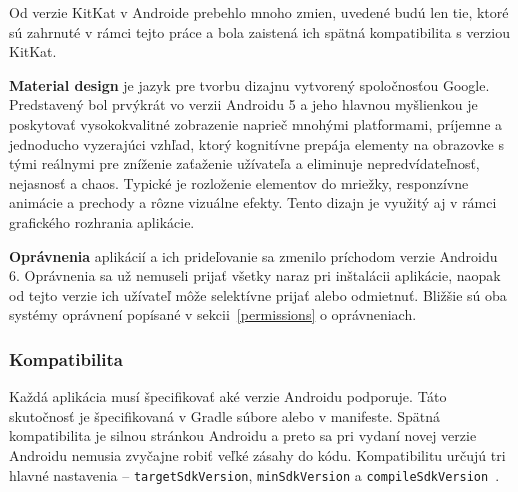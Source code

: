 
Od verzie KitKat v Androide prebehlo mnoho zmien, uvedené budú len tie, ktoré sú zahrnuté v rámci tejto práce a bola zaistená ich spätná kompatibilita s verziou KitKat. 

\textbf{Material design} je jazyk pre tvorbu dizajnu vytvorený spoločnosťou Google. Predstavený bol prvýkrát vo verzii Androidu 5 a jeho hlavnou myšlienkou je poskytovať vysokokvalitné zobrazenie naprieč mnohými platformami, príjemne a jednoducho vyzerajúci vzhľad, ktorý kognitívne prepája elementy na obrazovke s tými reálnymi pre zníženie zaťaženie užívateľa a eliminuje nepredvídateľnosť, nejasnosť a chaos. Typické je rozloženie elementov do mriežky, responzívne animácie a prechody a rôzne vizuálne efekty. Tento dizajn je využitý aj v rámci grafického rozhrania aplikácie.

\textbf{Oprávnenia} aplikácií a ich prideľovanie sa zmenilo príchodom verzie Androidu 6. Oprávnenia sa už nemuseli prijať všetky naraz pri inštalácii aplikácie, naopak od tejto verzie ich užívateľ môže selektívne prijať alebo odmietnuť. Bližšie sú oba systémy oprávnení popísané v sekcii~\ref{permissions} o oprávneniach.

\subsubsection{Kompatibilita}

Každá aplikácia musí špecifikovať aké verzie Androidu podporuje. Táto skutočnosť je špecifikovaná v Gradle súbore alebo v manifeste. Spätná kompatibilita je silnou stránkou Androidu a preto sa pri vydaní novej verzie Androidu nemusia zvyčajne robiť veľké zásahy do kódu. Kompatibilitu určujú tri hlavné nastavenia -- \texttt{targetSdkVersion}, \texttt{minSdkVersion} a \texttt{compileSdkVersion}~\cite{Thornsby}.

